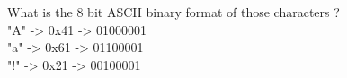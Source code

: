 \documentclass{article}
\begin{document}
\noindent What is the 8 bit ASCII
binary format of those characters ?\\
"A" -> 0x41 -> 01000001\\
"a" -> 0x61 -> 01100001\\
"!" -> 0x21 -> 00100001\\
\end{document}
